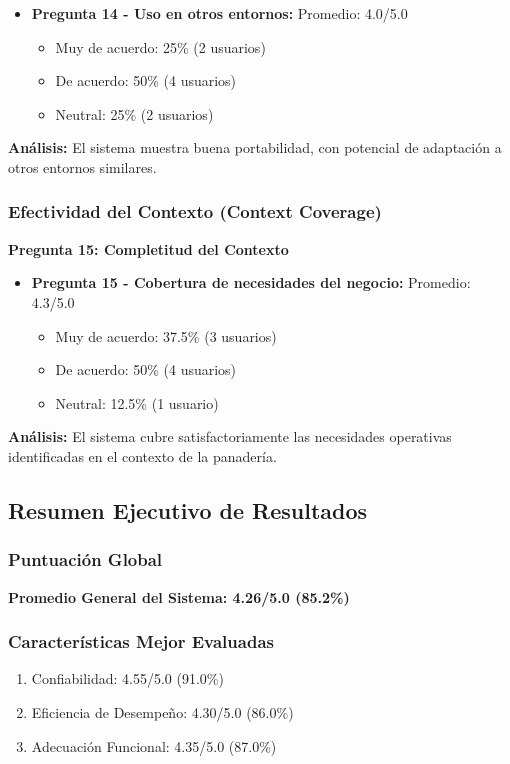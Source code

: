 \documentclass[conference]{IEEEtran}
\begin{document}
\begin{itemize}
    \item \textbf{Pregunta 14 - Uso en otros entornos:} Promedio: 4.0/5.0
        \begin{itemize}
            \item Muy de acuerdo: 25\% (2 usuarios)
            \item De acuerdo: 50\% (4 usuarios)
            \item Neutral: 25\% (2 usuarios)
        \end{itemize}
\end{itemize}

\textbf{Análisis:} El sistema muestra buena portabilidad, con potencial de adaptación a otros entornos similares.

\subsubsection{Efectividad del Contexto (Context Coverage)}
\textbf{Pregunta 15: Completitud del Contexto}

\begin{itemize}
    \item \textbf{Pregunta 15 - Cobertura de necesidades del negocio:} Promedio: 4.3/5.0
        \begin{itemize}
            \item Muy de acuerdo: 37.5\% (3 usuarios)
            \item De acuerdo: 50\% (4 usuarios)
            \item Neutral: 12.5\% (1 usuario)
        \end{itemize}
\end{itemize}

\textbf{Análisis:} El sistema cubre satisfactoriamente las necesidades operativas identificadas en el contexto de la panadería.

\subsection{Resumen Ejecutivo de Resultados}

\subsubsection{Puntuación Global}
\textbf{Promedio General del Sistema: 4.26/5.0 (85.2\%)}

\subsubsection{Características Mejor Evaluadas}
\begin{enumerate}
    \item Confiabilidad: 4.55/5.0 (91.0\%)
    \item Eficiencia de Desempeño: 4.30/5.0 (86.0\%)
    \item Adecuación Funcional: 4.35/5.0 (87.0\%)
\end{enumerate}
\end{document}
